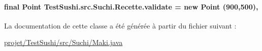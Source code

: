 \paragraph[{validate}]{\setlength{\rightskip}{0pt plus 5cm}final Point Test\+Sushi.\+src.\+Suchi.\+Recette.\+validate = new Point (900,500)\hspace{0.3cm}{\ttfamily [protected]}, {\ttfamily [inherited]}}\label{classTestSushi_1_1src_1_1Suchi_1_1Recette_a9c491e7f09a444817e433e54923e6bca}


La documentation de cette classe a été générée à partir du fichier suivant \+:\begin{DoxyCompactItemize}
\item 
\hyperlink{projet_2TestSushi_2src_2Suchi_2Maki_8java}{projet/\+Test\+Sushi/src/\+Suchi/\+Maki.\+java}\end{DoxyCompactItemize}
